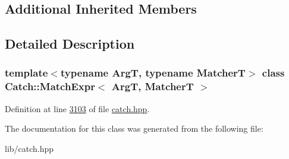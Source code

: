 \subsection*{Additional Inherited Members}


\subsection{Detailed Description}
\subsubsection*{template$<$typename ArgT, typename MatcherT$>$\newline
class Catch\+::\+Match\+Expr$<$ Arg\+T, Matcher\+T $>$}



Definition at line \mbox{\hyperlink{catch_8hpp_source_l03103}{3103}} of file \mbox{\hyperlink{catch_8hpp_source}{catch.\+hpp}}.



The documentation for this class was generated from the following file\+:\begin{DoxyCompactItemize}
\item 
lib/catch.\+hpp\end{DoxyCompactItemize}

